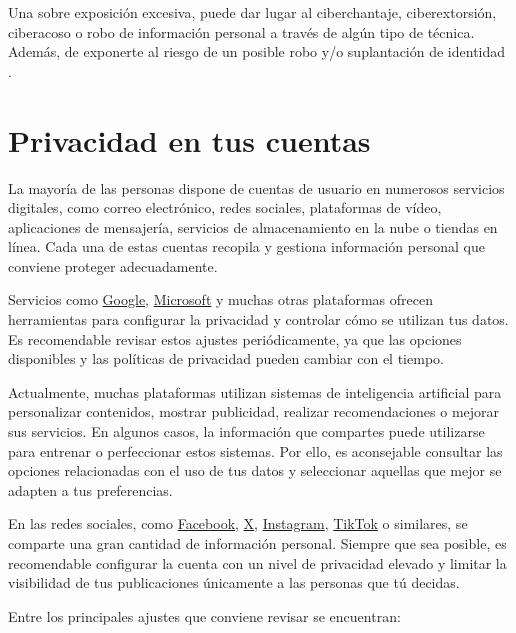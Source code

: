 \documentclass[
  spanish,
  a4paper,
  openany]{book}
\begin{document}
Una sobre exposición excesiva, puede dar lugar al ciberchantaje, ciberextorsión, ciberacoso o robo de información personal a través de algún tipo de técnica. Además, de exponerte al riesgo de un posible robo y/o suplantación de identidad \citep{AEPD-oversharing}.

\section{Privacidad en tus cuentas}\label{privacidad-en-tus-cuentas}

La mayoría de las personas dispone de cuentas de usuario en numerosos servicios digitales, como correo electrónico, redes sociales, plataformas de vídeo, aplicaciones de mensajería, servicios de almacenamiento en la nube o tiendas en línea. Cada una de estas cuentas recopila y gestiona información personal que conviene proteger adecuadamente.

Servicios como \href{https://myaccount.google.com/data-and-personalization}{Google}, \href{https://account.microsoft.com/account/privacy}{Microsoft} y muchas otras plataformas ofrecen herramientas para configurar la privacidad y controlar cómo se utilizan tus datos. Es recomendable revisar estos ajustes periódicamente, ya que las opciones disponibles y las políticas de privacidad pueden cambiar con el tiempo.

Actualmente, muchas plataformas utilizan sistemas de inteligencia artificial para personalizar contenidos, mostrar publicidad, realizar recomendaciones o mejorar sus servicios. En algunos casos, la información que compartes puede utilizarse para entrenar o perfeccionar estos sistemas. Por ello, es aconsejable consultar las opciones relacionadas con el uso de tus datos y seleccionar aquellas que mejor se adapten a tus preferencias.

En las redes sociales, como \href{https://es-la.facebook.com/help/325807937506242}{Facebook}, \href{https://help.x.com/es/safety-and-security\#ads-and-data-privacy}{X}, \href{https://es-es.facebook.com/help/instagram/196883487377501/?helpref=hc_fnav&bc\%5B0\%5D=Ayuda\%20de\%20Instagram&bc\%5B1\%5D=Administrar\%20tu\%20cuenta}{Instagram}, \href{https://support.tiktok.com/es/account-and-privacy}{TikTok} o similares, se comparte una gran cantidad de información personal. Siempre que sea posible, es recomendable configurar la cuenta con un nivel de privacidad elevado y limitar la visibilidad de tus publicaciones únicamente a las personas que tú decidas.

Entre los principales ajustes que conviene revisar se encuentran:
\end{document}
